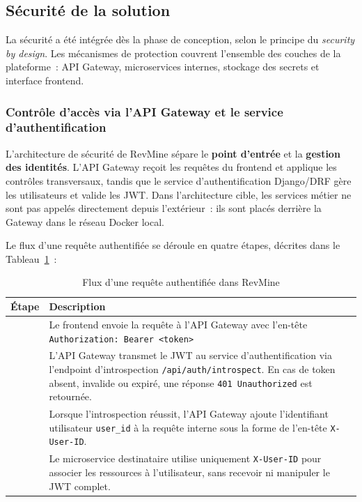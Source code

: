 \subsection{Sécurité de la solution}

La sécurité a été intégrée dès la phase de conception, selon le principe du
\textit{security by design}. Les mécanismes de protection couvrent l'ensemble des couches de
la plateforme~: API Gateway, microservices internes, stockage des secrets et interface frontend.

\subsubsection{Contrôle d'accès via l'API Gateway et le service d'authentification}

L'architecture de sécurité de RevMine sépare le \textbf{point d'entrée} et la \textbf{gestion des
identités}. L'API Gateway reçoit les requêtes du frontend et applique les contrôles transversaux,
tandis que le service d'authentification Django/DRF gère les utilisateurs et valide les JWT. Dans
l'architecture cible, les services métier ne sont pas appelés directement depuis l'extérieur~:
ils sont placés derrière la Gateway dans le réseau Docker local.

Le flux d'une requête authentifiée se déroule en quatre étapes, décrites dans le
Tableau~\ref{tab:flux-auth}~:

\begin{table}[H]
\centering
\small
\caption{Flux d'une requête authentifiée dans RevMine}
\label{tab:flux-auth}
\begin{tabular}{|>{\centering\arraybackslash}p{0.8cm}
                |>{\raggedright\arraybackslash}p{12.5cm}|}
\hline
\textbf{Étape} & \textbf{Description} \\
\hline
1 & Le frontend envoie la requête à l'API Gateway avec l'en-tête \texttt{Authorization: Bearer <token>} \\
\hline
2 & L'API Gateway transmet le JWT au service d'authentification via l'endpoint d'introspection
    \texttt{/api/auth/introspect}. En cas de token absent, invalide ou expiré, une réponse
    \texttt{401 Unauthorized} est retournée. \\
\hline
3 & Lorsque l'introspection réussit, l'API Gateway ajoute l'identifiant utilisateur
    \texttt{user\_id} à la requête interne sous la forme de l'en-tête \texttt{X-User-ID}. \\
\hline
4 & Le microservice destinataire utilise uniquement \texttt{X-User-ID} pour associer les
    ressources à l'utilisateur, sans recevoir ni manipuler le JWT complet. \\
\hline
\end{tabular}
\end{table}

